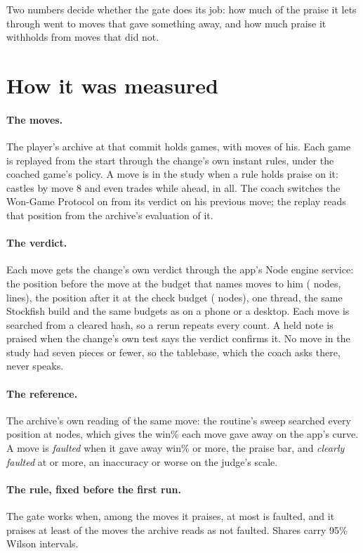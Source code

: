 \documentclass[11pt]{article}
\begin{document}
Two numbers decide whether the gate does its job: how much of the praise it lets through went to
moves that gave something away, and how much praise it withholds from moves that did not.

\section{How it was measured}

\paragraph{The moves.} The player's archive at that commit holds \Games{} games, with
\HisMoves{} moves of his. Each game is replayed from the start through the change's own instant
rules, under the coached game's policy. A move is in the study when a rule holds praise on it:
\Castles{} castles by move 8 and \Trades{} even trades while ahead, \Moves{} in all. The coach
switches the Won-Game Protocol on from its verdict on his previous move; the replay reads that
position from the archive's evaluation of it.

\paragraph{The verdict.} Each move gets the change's own verdict through the app's Node engine
service: the position before the move at the budget that names moves to him (\NamingNodes{}
nodes, \Lines{} lines), the position after it at the check budget (\CheckNodes{} nodes), one
thread, the same Stockfish build and the same budgets as on a phone or a desktop. Each move is
searched from a cleared hash, so a rerun repeats every count. A held note is praised when the
change's own test says the verdict confirms it. No move in the study had seven pieces or fewer,
so the tablebase, which the coach asks there, never speaks.

\paragraph{The reference.} The archive's own reading of the same move: the routine's sweep
searched every position at \ArchiveNodes{} nodes, which gives the win\% each move gave away on
the app's curve. A move is \emph{faulted} when it gave away \PraiseBar{} win\% or more, the praise bar,
and \emph{clearly faulted} at \ClearBar{} or more, an inaccuracy or worse on the judge's scale.

\paragraph{The rule, fixed before the first run.} The gate works when, among the moves it
praises, at most \RuleFaulted{} is faulted, and it praises at least \RuleFine{} of the moves the
archive reads as not faulted. Shares carry 95\% Wilson intervals.
\end{document}
